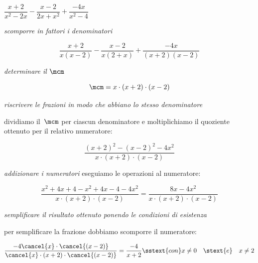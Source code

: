 \begin{esempio}{}{}
\(\dfrac{x+2}{x^{2}-2x}-\dfrac{x-2}{2x+x^{2}}+\dfrac{-4x}{x^{2}-4}\)\\

\begin{enumeratea}
\item \emph{scomporre in fattori i denominatori}

\vspace{-1.2em}
\[\dfrac{x+2}{x(x-2)}-\dfrac{x-2}{x(2+x)}+\dfrac{-4x}{(x+2)(x-2)}\]

\item \emph{determinare il \(\mcm\)}

\vspace{-1.2em}
\[\mcm = x\cdot (x+2) \cdot (x-2)\]


\item \emph{riscrivere le frazioni in modo che abbiano lo stesso
denominatore}

dividiamo il~\(\mcm\) per ciascun denominatore e moltiplichiamo il 
quoziente ottenuto per il relativo numeratore:

\vspace{-1.2em}
\[\dfrac{(x+2)^{2}-(x-2)^{2}-4x^{2}}{x\cdot(x+2)\cdot(x-2)}\]
\item \emph{addizionare i numeratori} eseguiamo le operazioni al 
numeratore:

\vspace{-1.2em}
  \begin{equation*}
    \dfrac{x^{2}+4x+4-x^{2}+4x-4-4x^{2}}{x\cdot(x+2)\cdot(x-2)}=
    \dfrac{8x-4x^{2}}{x\cdot(x+2)\cdot(x-2)}
    \end{equation*}
\item \emph{semplificare il risultato ottenuto ponendo le condizioni di 
esistenza}

per semplificare la frazione dobbiamo scomporre il numeratore:

\vspace{-1.2em}
\begin{equation*}
\dfrac{-4\cancel{x}\cdot\cancel{(x-2)}}
      {\cancel{x}\cdot(x+2)\cdot\cancel{(x-2)}}=
\dfrac{-4}{x+2} \sstext{con} x \neq 0 \quad  \stext{e} \quad x \neq 2
  \end{equation*}
\end{enumeratea}
\end{esempio}

